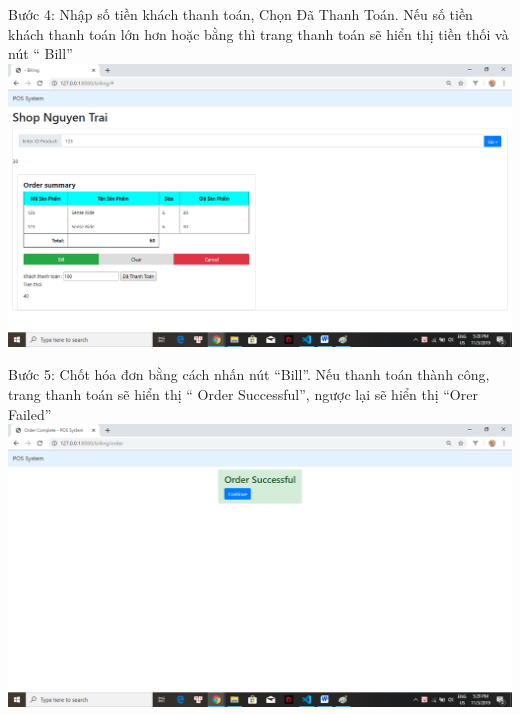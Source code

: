 \documentclass{article}
\begin{document}
Bước 4: Nhập số tiền khách thanh toán, Chọn Đã Thanh Toán. Nếu số tiền khách thanh toán lớn hơn hoặc bằng thì trang thanh toán sẽ hiển thị tiền thối và nút “ Bill” \\

\includegraphics[scale = 0.5]{26.png}

Bước 5: Chốt hóa đơn bằng cách nhấn nút “Bill”. Nếu thanh toán thành công, trang thanh toán sẽ hiển thị “ Order Successful”, ngược lại sẽ hiển thị “Orer Failed” \\

\includegraphics[scale = 0.5]{27.png}
\end{document}

